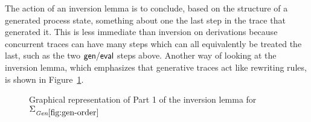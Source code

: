 The action of an inversion lemma is to conclude, based on the
structure of a generated process state, something about one the last
step in the trace that generated it. This is less immediate than
inversion on derivations because concurrent traces can have many steps
which can all equivalently be treated the last, such as the two ${\sf
  gen/eval}$ steps above. Another way of looking at the inversion
lemma, which emphasizes that generative traces act like rewriting
rules, is shown in Figure~\ref{fig:show-inversion}.

\begin{figure}
\begin{center}
\end{center}
\caption{Graphical representation of Part 1 of the inversion lemma
for $\siggenorder$}\label{fig:show-inversion}
\end{figure}

